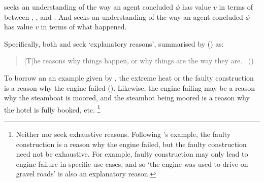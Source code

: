 \begin{note}
  \qWhy{} seeks an understanding of the way an agent concluded \(\phi\) has value \(v\) in terms of \ros{} between , , and .
  And \qHow{} seeks an understanding of the way an agent concluded \(\phi\) has value \(v\) in terms of what happened.

  Specifically, both \qWhy{} and \qHow{} seek `explanatory reasons', summarised by \citeauthor{Hieronymi:2011aa} (\citeyear{Hieronymi:2011aa}) as:
  \begin{quote}
    [T]he reasons why things happen, or why things are the way they are.\newline
    \mbox{ }\hfill\mbox{(\citeyear[410]{Hieronymi:2011aa})}
  \end{quote}
  To borrow an an example given by \citeauthor{Hieronymi:2011aa}, the extreme heat or the faulty construction is a reason why the engine failed (\citeyear[409]{Hieronymi:2011aa}).
  Likewise, the engine failing may be a reason why the steamboat is moored, and the steambot being moored is a reason why the hotel is fully booked, etc.%
  \footnote{
    Neither \qWhy{} nor \qHow{} seek exhaustive reasons.
    Following \citeauthor{Hieronymi:2011aa}'s example, the faulty construction is a reason why the engine failed, but the faulty construction need not be exhaustive.
    For example, faulty construction may only lead to engine failure in specific use cases, and so `the engine was used to drive on gravel roads' is also an explanatory reason.
  }
\end{note}

